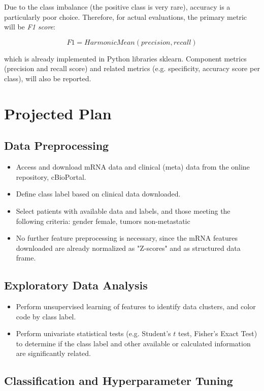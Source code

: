\documentclass[11pt]{diazessay}
\begin{document}
Due to the class imbalance (the positive class is very rare), accuracy is a particularly poor choice. Therefore, for actual evaluations, the primary metric will be \textit{F1 score}:

$$F1 = HarmonicMean(precision, recall)$$

which is already implemented in Python libraries sklearn. Component metrics (precision and recall score) and related metrics (e.g. specificity, accuracy score per class), will also be reported.


\section{Projected Plan}

\subsection{Data Preprocessing}

\begin{itemize}
	\item Access and download mRNA data and clinical (meta) data from the online repository, cBioPortal.
	\item Define class label based on clinical data downloaded.
	\item Select patients with available data and labels, and those meeting the following criteria: gender female, tumors non-metastatic
	\item No further feature preprocessing is necessary, since the mRNA features downloaded are already normalized as "Z-scores" and as structured data frame.
\end{itemize}

\subsection{Exploratory Data Analysis}

\begin{itemize}
	\item Perform unsupervised learning of features to identify data clusters, and color code by class label.
	\item Perform univariate statistical tests (e.g. Student's $t$ test, Fisher's Exact Test) to determine if the class label and other available or calculated information are significantly related.
\end{itemize}

\subsection{Classification and Hyperparameter Tuning}
\end{document}

